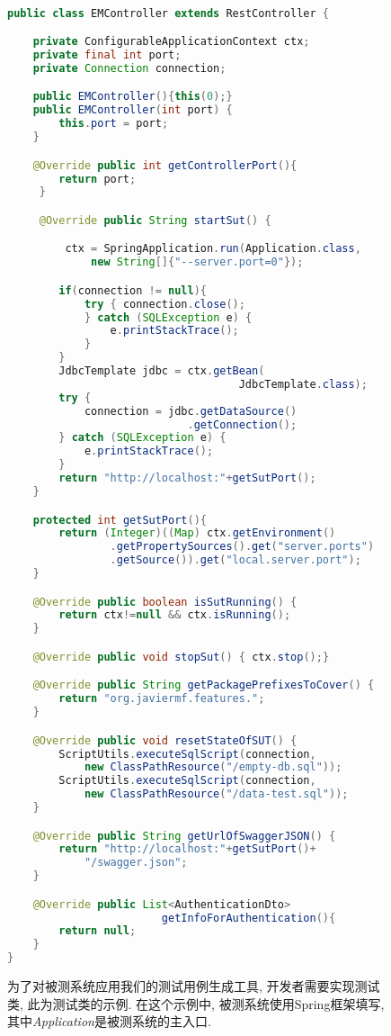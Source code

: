   \begin{figure}
        {
        \tt
        \tiny
      \begin{lstlisting}[language=java]
public class EMController extends RestController {

    private ConfigurableApplicationContext ctx;
    private final int port;
    private Connection connection;

    public EMController(){this(0);}
    public EMController(int port) {
        this.port = port;
    }

    @Override public int getControllerPort(){
        return port;
     }

     @Override public String startSut() {

         ctx = SpringApplication.run(Application.class,
             new String[]{"--server.port=0"});

        if(connection != null){
            try { connection.close();
            } catch (SQLException e) {
                e.printStackTrace();
            }
        }
        JdbcTemplate jdbc = ctx.getBean(
                                    JdbcTemplate.class);
        try {
            connection = jdbc.getDataSource()
                            .getConnection();
        } catch (SQLException e) {
            e.printStackTrace();
        }
        return "http://localhost:"+getSutPort();
    }

    protected int getSutPort(){
        return (Integer)((Map) ctx.getEnvironment()
                .getPropertySources().get("server.ports")
                .getSource()).get("local.server.port");
    }

    @Override public boolean isSutRunning() {
        return ctx!=null && ctx.isRunning();
    }

    @Override public void stopSut() { ctx.stop();}

    @Override public String getPackagePrefixesToCover() {
        return "org.javiermf.features.";
    }

    @Override public void resetStateOfSUT() {
        ScriptUtils.executeSqlScript(connection,
            new ClassPathResource("/empty-db.sql"));
        ScriptUtils.executeSqlScript(connection,
            new ClassPathResource("/data-test.sql"));
    }

    @Override public String getUrlOfSwaggerJSON() {
        return "http://localhost:"+getSutPort()+
            "/swagger.json";
    }

    @Override public List<AuthenticationDto>
                        getInfoForAuthentication(){
        return null;
    }
}
    \end{lstlisting}
        }
        \caption{为了对被测系统应用我们的测试用例生成工具, 开发者需要实现测试类, 此为测试类的示例. 在这个示例中, 被测系统使用Spring框架填写, 其中\textit{Application}是被测系统的主入口. }
        \label{fig4}
    \end{figure}

